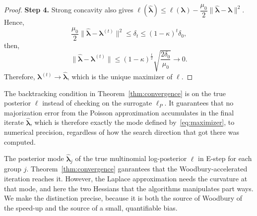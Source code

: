 \begin{proof}
    \noindent\textbf{Step 4.} Strong concavity also gives $\ell(\hat{\bm{\lambda}})\leq\ell(\bm{\lambda})-\dfrac{\mu_{0}}{2}\|\hat{\bm{\lambda}}-\bm{\lambda}\|^{2}$. Hence, 
    \begin{equation}
        \dfrac{\mu_{0}}{2}\|\hat{\bm{\lambda}}-\bm{\lambda}^{(t)}\|^{2}\leq \delta_{t}\leq (1-\kappa)^{t}\delta_{0},
        \label{eq:step4-1}
    \end{equation}
    then,
    \begin{equation}
        \|\hat{\bm{\lambda}}-\bm{\lambda}^{(t)}\|\leq (1-\kappa)^{\frac{t}{2}}\sqrt{\frac{2\delta_{0}}{\mu_{0}}}\to 0.
        \label{eq:step4-2}
    \end{equation}
    Therefore, $\bm{\lambda}^{(t)}\to \hat{\bm{\lambda}}$, which is the unique maximizer of $\ell$.
\end{proof}

\begin{remark}
    The backtracking condition in Theorem~\ref{thm:convergence} is on the true posterior $\ell$ instead of checking on the surrogate $\ell_{P}$. It guarantees that no majorization error from the Poisson approximation accumulates in the final iterate $\hat{\bm{\lambda}}$, which is therefore exactly the mode defined by~\eqref{eq:maximizer}, to numerical precision, regardless of how the search direction that got there was computed.
\end{remark}

The posterior mode $\hat{\bm{\lambda}}_{j}$ of the true multinomial log-posterior $\ell$ in E-step for each group $j$. Theorem~\ref{thm:convergence} ganrantees that the Woodbury-accelerated iteration reaches it. However, the Laplace approximation needs the curvature at that mode, and here the two Hessians that the algorithms manipulates part ways. We make the distinction precise, because it is both the source of Woodbury of the speed-up and the source of a small, quantifiable bias.

